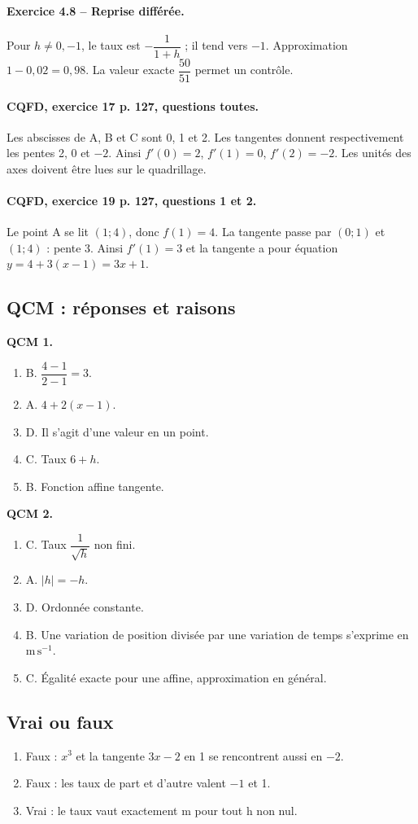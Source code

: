 \paragraph{Exercice 4.8 -- Reprise différée.} Pour $h\ne0,-1$, le taux est $-\dfrac{1}{1+h}$ ; il tend vers $-1$. Approximation $1-0{,}02=0{,}98$. La valeur exacte $\dfrac{50}{51}$ permet un contrôle.
\paragraph{CQFD, exercice 17 p. 127, questions toutes.} Les abscisses de A, B et C sont 0, 1 et 2. Les tangentes donnent respectivement les pentes 2, 0 et $-2$. Ainsi $f\prime(0)=2$, $f\prime(1)=0$, $f\prime(2)=-2$. Les unités des axes doivent être lues sur le quadrillage.
\paragraph{CQFD, exercice 19 p. 127, questions 1 et 2.} Le point A se lit $(1;4)$, donc $f(1)=4$. La tangente passe par $(0;1)$ et $(1;4)$ : pente 3. Ainsi $f\prime(1)=3$ et la tangente a pour équation $y=4+3(x-1)=3x+1$.
\subsection*{QCM : réponses et raisons}
\textbf{QCM 1.}
\begin{enumerate}
\item B. $\dfrac{4-1}{2-1}=3$.
\item A. $4+2(x-1)$.
\item D. Il s’agit d’une valeur en un point.
\item C. Taux $6+h$.
\item B. Fonction affine tangente.
\end{enumerate}
\textbf{QCM 2.}
\begin{enumerate}
\item C. Taux $\dfrac{1}{\sqrt h}$ non fini.
\item A. $|h|=-h$.
\item D. Ordonnée constante.
\item B. Une variation de position divisée par une variation de temps s’exprime en $\mathrm{m\,s^{-1}}$.
\item C. Égalité exacte pour une affine, approximation en général.
\end{enumerate}
\subsection*{Vrai ou faux}
\begin{enumerate}
\item Faux : $x^3$ et la tangente $3x-2$ en 1 se rencontrent aussi en $-2$.
\item Faux : les taux de part et d’autre valent $-1$ et 1.
\item Vrai : le taux vaut exactement m pour tout h non nul.
\end{enumerate}
